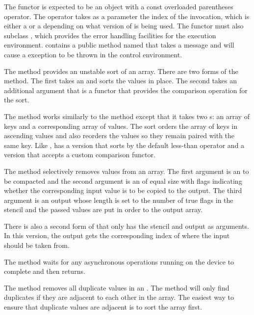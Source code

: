 \begin{description}
  The functor is expected to be an object with a const overloaded
  parentheses operator. The operator takes as a parameter the index of the
  invocation, which is either a  or a  depending on what
  version of  is being used. The functor must also
  subclass , which provides the error handling
  facilities for the execution environment. 
  contains a public method named 
    that takes a
  message and will cause a  exception to be thrown
  in the control environment.
\item[\textcode{Sort}]  The  method provides an
  unstable sort of an array. There are two forms of the 
  method. The first takes an  and sorts the
  values in place. The second takes an additional argument that is a
  functor that provides the comparison operation for the sort.
\item[\textcode{SortByKey}]  The 
  method works similarly to the  method except that it takes
  two s: an array of keys and a corresponding
  array of values. The sort orders the array of keys in ascending values
  and also reorders the values so they remain paired with the same
  key. Like ,  has a version that sorts
  by the default less-than operator and a version that accepts a custom
  comparison functor.
\item[\textcode{StreamCompact}]  The
   method selectively removes values from an
  array. The first argument is an  to be
  compacted and the second argument is an  of
  equal size with flags indicating whether the corresponding input value is
  to be copied to the output. The third argument is an output
   whose length is set to the number of true
  flags in the stencil and the passed values are put in order to the output
  array.

  There is also a second form of  that only
  has the stencil and output as arguments. In this version, the output gets
  the corresponding index of where the input should be taken from.
\item[\textcode{Synchronize}]  The
   method waits for any asynchronous operations
  running on the device to complete and then returns.
\item[\textcode{Unique}]  The  method
  removes all duplicate values in an . The
  method will only find duplicates if they are adjacent to each other in
  the array. The easiest way to ensure that duplicate values are adjacent
  is to sort the array first.


\end{description}
